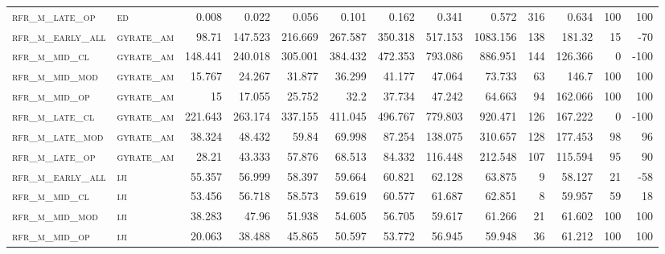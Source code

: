 \begin{landscape}
\begin{center}
\begin{footnotesize}
\begin{longtable}{llrrrrrrrr|rrr}
\textsc{rfr\_m\_late\_op  } & \textsc{ed        }   & 0.008   & 0.022   & 0.056   & 0.101    & 0.162    & 0.341    & 0.572    & 316    & 0.634         & 100           & 100             \\
\textsc{rfr\_m\_early\_all} & \textsc{gyrate\_am}   & 98.71   & 147.523 & 216.669 & 267.587  & 350.318  & 517.153  & 1083.156 & 138    & 181.32        & 15            & -70             \\
\textsc{rfr\_m\_mid\_cl   } & \textsc{gyrate\_am}   & 148.441 & 240.018 & 305.001 & 384.432  & 472.353  & 793.086  & 886.951  & 144    & 126.366       & 0             & -100            \\
\textsc{rfr\_m\_mid\_mod  } & \textsc{gyrate\_am}   & 15.767  & 24.267  & 31.877  & 36.299   & 41.177   & 47.064   & 73.733   & 63     & 146.7         & 100           & 100             \\
\textsc{rfr\_m\_mid\_op   } & \textsc{gyrate\_am}   & 15      & 17.055  & 25.752  & 32.2     & 37.734   & 47.242   & 64.663   & 94     & 162.066       & 100           & 100             \\
\textsc{rfr\_m\_late\_cl  } & \textsc{gyrate\_am}   & 221.643 & 263.174 & 337.155 & 411.045  & 496.767  & 779.803  & 920.471  & 126    & 167.222       & 0             & -100            \\
\textsc{rfr\_m\_late\_mod } & \textsc{gyrate\_am}   & 38.324  & 48.432  & 59.84   & 69.998   & 87.254   & 138.075  & 310.657  & 128    & 177.453       & 98            & 96              \\
\textsc{rfr\_m\_late\_op  } & \textsc{gyrate\_am}   & 28.21   & 43.333  & 57.876  & 68.513   & 84.332   & 116.448  & 212.548  & 107    & 115.594       & 95            & 90              \\
\textsc{rfr\_m\_early\_all} & \textsc{iji       }   & 55.357  & 56.999  & 58.397  & 59.664   & 60.821   & 62.128   & 63.875   & 9      & 58.127        & 21            & -58             \\
\textsc{rfr\_m\_mid\_cl   } & \textsc{iji       }   & 53.456  & 56.718  & 58.573  & 59.619   & 60.577   & 61.687   & 62.851   & 8      & 59.957        & 59            & 18              \\
\textsc{rfr\_m\_mid\_mod  } & \textsc{iji       }   & 38.283  & 47.96   & 51.938  & 54.605   & 56.705   & 59.617   & 61.266   & 21     & 61.602        & 100           & 100             \\
\textsc{rfr\_m\_mid\_op   } & \textsc{iji       }   & 20.063  & 38.488  & 45.865  & 50.597   & 53.772   & 56.945   & 59.948   & 36     & 61.212        & 100           & 100             \\

\end{longtable}
\end{footnotesize}
\end{center}
\end{landscape}
